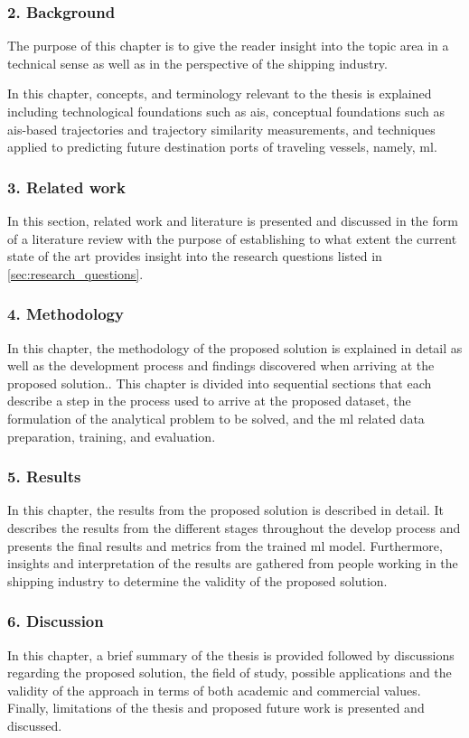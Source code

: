 \subsubsection{2. Background}

The purpose of this chapter is to give the reader insight into the topic area in a technical sense as well as in the perspective of the shipping industry.

In this chapter, concepts, and terminology relevant to the thesis is explained including technological foundations such as \acrfull{ais}, conceptual foundations such as \acrshort{ais}-based trajectories and trajectory similarity measurements, and techniques applied to predicting future destination ports of traveling vessels, namely, \acrfull{ml}.

\subsubsection{3. Related work}

In this section, related work and literature is presented and discussed in the form of a literature review with the purpose of establishing to what extent the current state of the art provides insight into the research questions listed in \cref{sec:research_questions}.

\subsubsection{4. Methodology}

In this chapter, the methodology of the proposed solution is explained in detail as well as the development process and findings discovered when arriving at the proposed solution.. This chapter is divided into sequential sections that each describe a step in the process used to arrive at the proposed dataset, the formulation of the analytical problem to be solved, and the \acrfull{ml} related data preparation, training, and evaluation.

\subsubsection{5. Results}

In this chapter, the results from the proposed solution is described in detail. It describes the results from the different stages throughout the develop process and presents the final results and metrics from the trained \acrfull{ml} model. Furthermore, insights and interpretation of the results are gathered from people working in the shipping industry to determine the validity of the proposed solution.

\subsubsection{6. Discussion}

In this chapter, a brief summary of the thesis is provided followed by discussions regarding the proposed solution, the field of study, possible applications and the validity of the approach in terms of both academic and commercial values. Finally, limitations of the thesis and proposed future work is presented and discussed.
